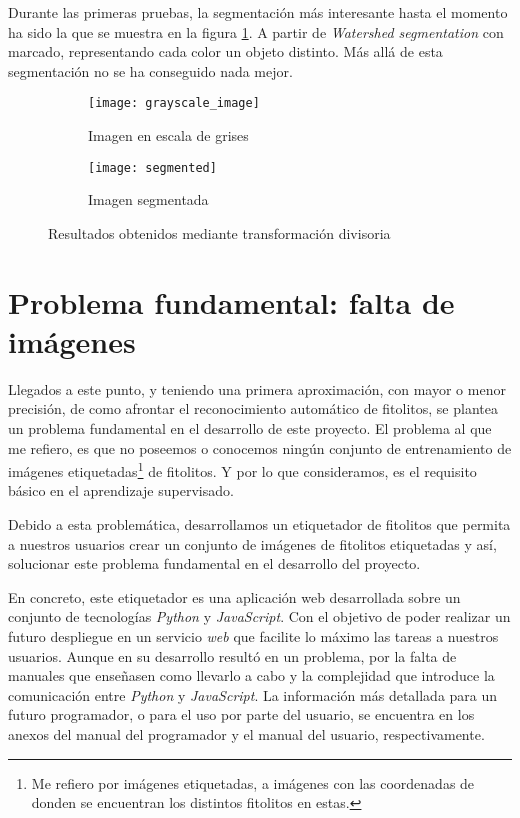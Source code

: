Durante las primeras pruebas, la segmentación más interesante hasta el momento ha sido la que se muestra en la figura \ref{fig:5.1.3}. A partir de \textit{Watershed segmentation} con marcado, representando cada color un objeto distinto. Más allá de esta segmentación no se ha conseguido nada mejor.

\begin{figure}
	\centering
	\begin{subfigure}[b]{0.45\textwidth}
        \texttt{[image: grayscale\_image]}
        \caption{Imagen en escala de grises}
    \end{subfigure}
    \begin{subfigure}[b]{0.45\textwidth}
        \texttt{[image: segmented]}
        \caption{Imagen segmentada}
    \end{subfigure}
        \caption{Resultados obtenidos mediante transformación divisoria}
	\label{fig:5.1.3}
\end{figure} 	

\section{Problema fundamental: falta de imágenes}

Llegados a este punto, y teniendo una primera aproximación, con mayor o menor precisión, de como afrontar el reconocimiento automático de fitolitos, se plantea un problema fundamental en el desarrollo de este proyecto. El problema al que me refiero, es que no poseemos o conocemos ningún conjunto de entrenamiento de imágenes etiquetadas\footnote{Me refiero por imágenes etiquetadas, a imágenes con las coordenadas de donden se encuentran los distintos fitolitos en estas.} de fitolitos. Y por lo que consideramos, es el requisito básico en el aprendizaje supervisado.

Debido a esta problemática, desarrollamos un etiquetador de fitolitos que permita a nuestros usuarios crear un conjunto de imágenes de fitolitos etiquetadas y así, solucionar este problema fundamental en el desarrollo del proyecto.

En concreto, este etiquetador es una aplicación web desarrollada sobre un conjunto de tecnologías \textit{Python} y \textit{JavaScript}. Con el objetivo de poder realizar un futuro despliegue en un servicio \textit{web} que facilite lo máximo las tareas a nuestros usuarios. Aunque en su desarrollo resultó en un problema, por la falta de manuales que enseñasen como llevarlo a cabo y la complejidad que introduce la comunicación entre \textit{Python} y \textit{JavaScript}. La información más detallada para un futuro programador, o para el uso por parte del usuario, se encuentra en los anexos del manual del programador y el manual del usuario, respectivamente.

